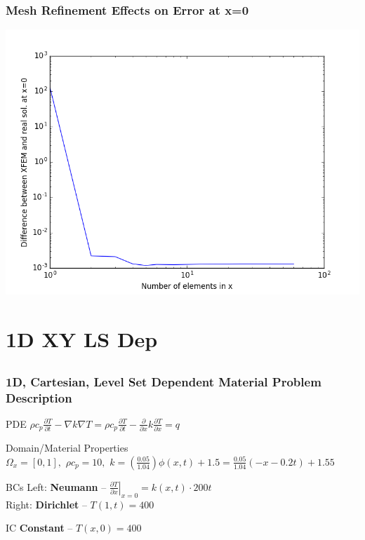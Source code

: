 \documentclass[]{beamer}
\begin{document}
\begin{frame}[t]\frametitle{Mesh Refinement Effects on Error at x=0}
	\begin{center}
		\includegraphics[scale=0.4]{figures/1D_xy_h1m/1D_xy_homog1mat_neumann_comp}
	\end{center}
\end{frame}

\section{1D XY LS Dep}
\subsection{}
\begin{frame}[t]\frametitle{1D, Cartesian, Level Set Dependent Material Problem Description}
  \begin{block}{PDE}
    $\rho c_p\frac{\partial T}{\partial t} - \nabla k \nabla T = \rho c_p\frac{\partial T}{\partial t} - \frac{\partial}{\partial x} k \frac{\partial T}{\partial x}= q$
  \end{block}
  
  \begin{block}{Domain/Material Properties}
  	$\Omega_x = [0,1], \,\, \rho c_p = 10, \,\, k=\left(\frac{0.05}{1.04}\right) \phi(x,t) + 1.5
  	= \frac{0.05}{1.04}\left( - x - 0.2t\right) + 1.55$
  \end{block}
  
  \begin{block}{BCs}
    Left:  \textbf{Neumann} -- $\left. \frac{\partial T}{\partial x}\right|_{x=0} = k(x,t) \cdot 200t$ \\
    Right: \textbf{Dirichlet} -- $T(1,t) = 400$
  \end{block}
  
  \begin{block}{IC}
    \textbf{Constant} -- $T(x,0) = 400$
  \end{block}
\end{frame}
\end{document}
